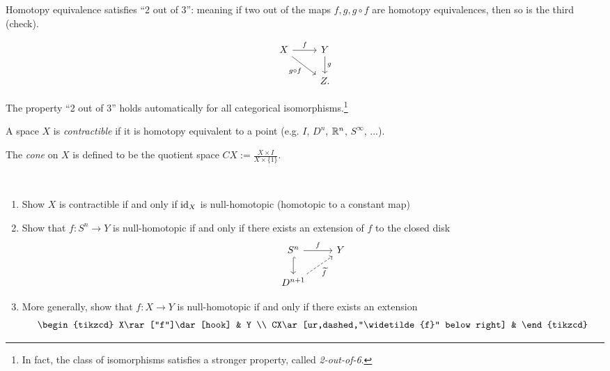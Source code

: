 \documentclass{article}[11pt]
\begin{document}
\begin{proposition} Homotopy equivalence satisfies ``2 out of 3'': meaning if two out of the maps $f, g, g\circ f$ are homotopy equivalences, then so is the third (check).

\[
	\begin{tikzcd}
	X\rar["f"]\ar[dr,"g\circ f" below left] & Y\dar["g" right] \\
	 & Z.
	\end{tikzcd}
\]

\begin{note} The property ``2 out of 3'' holds automatically for all categorical isomorphisms.\footnote{In fact, the class of isomorphisms satisfies a stronger property, called \textit{2-out-of-6}.}
\end{note}

\end{proposition}



\begin{definition} A space $X$ is \textit{contractible} if it is homotopy equivalent to a point (e.g. $I$, $D^n$, $\mathbb{R}^n$, $S^\infty$, ...).
\end{definition}

\begin{definition} The \textit{cone} on $X$ is defined to be the quotient space $CX := \frac{X\times I}{X\times \{1\}}$.
\end{definition}


\begin{exercise} $\ $
\begin{enumerate}
	\item Show $X$ is contractible if and only if $\text{id}_X$ is null-homotopic (homotopic to a constant map)
	\item Show that $f: S^n \to Y$ is null-homotopic if and only if there exists an extension of $f$ to the closed disk
	\[
		\begin{tikzcd}
		S^n\rar["f"]\dar[hook] & Y \\
		D^{n+1}\ar[ur,dashed,"\widetilde{f}" below right] &
		\end{tikzcd}
	\]

	\item More generally, show that $f: X \to Y$ is null-homotopic if and only if there exists an extension
	\[
		\begin{tikzcd}
		X\rar["f"]\dar[hook] & Y \\
		CX\ar[ur,dashed,"\widetilde{f}" below right] &
		\end{tikzcd}
	\]
\end{enumerate}
\end{exercise}
\end{document}
